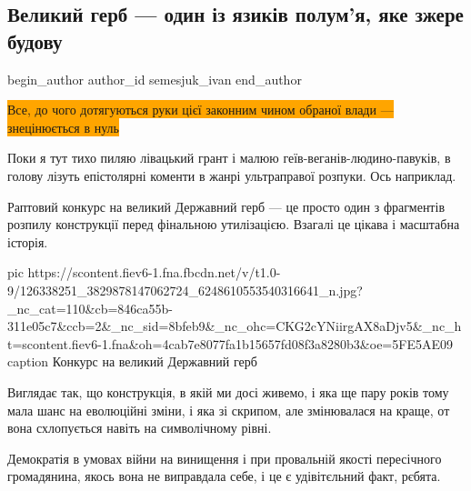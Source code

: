  
 
 
 
 
\subsection{Великий герб --- один із язиків полум'я, яке зжере будову}
\label{sec:20_11_2020.news.ua.gazeta.semesjuk_ivan.1.gerb}
\ifcmt
	begin_author
   author_id semesjuk_ivan
	end_author
\fi

\begin{center}
  \begin{fminipage}{0.7\textwidth}
		\color{blue}
		\colorbox{orange}{
		Все, до чого дотягуються руки цієї законним чином обраної влади --- знецінюється в нуль
		}
  \end{fminipage}
\end{center}
  
Поки я тут тихо пиляю лівацький грант і малюю геїв-веганів-людино-павуків, в
голову лізуть епістолярні коменти в жанрі ультраправої розпуки. Ось наприклад.

Раптовий конкурс на великий Державний герб --- це просто один з фрагментів
розпилу конструкції перед фінальною утилізацією. Взагалі це цікава і масштабна
історія.

\ifcmt
pic https://scontent.fiev6-1.fna.fbcdn.net/v/t1.0-9/126338251_3829878147062724_6248610553540316641_n.jpg?_nc_cat=110&cb=846ca55b-311e05c7&ccb=2&_nc_sid=8bfeb9&_nc_ohc=CKG2cYNiirgAX8aDjv5&_nc_ht=scontent.fiev6-1.fna&oh=4cab7e8077fa1b15657fd08f3a8280b3&oe=5FE5AE09
caption Конкурс на великий Державний герб
\fi

Виглядає так, що конструкція, в якій ми досі живемо, і яка ще пару років тому
мала шанс на еволюційні зміни, і яка зі скрипом, але змінювалася на краще, от
вона схлопується навіть на символічному рівні.

Демократія в умовах війни на винищення і при провальній якості пересічного
громадянина, якось вона не виправдала себе, і це є удівітєльний факт, рєбята.

